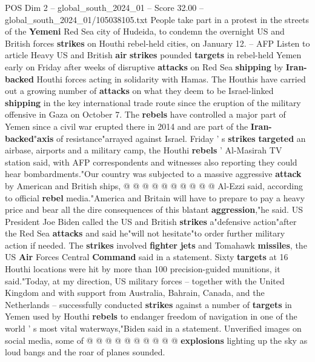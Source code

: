 \begin{textsample}{POS Dim 2 – global\_south\_2024\_01 – Score 32.00 – global\_south\_2024\_01/105038105.txt}  \label{ex:f2_pos_091}
People take part in a protest in the streets of the \textbf{Yemeni} Red Sea city of Hudeida, to condemn the overnight US and British forces \textbf{strikes} on Houthi rebel-held cities, on January 12. -- AFP Listen to article Heavy US and British \textbf{air} \textbf{strikes} pounded \textbf{targets} in rebel-held Yemen early on Friday after weeks of disruptive \textbf{attacks} on Red Sea \textbf{shipping} by \textbf{Iran-backed} Houthi forces acting in solidarity with Hamas.
The Houthis have carried out a growing number of \textbf{attacks} on what they deem to be Israel-linked \textbf{shipping} in the key international trade route since the eruption of the military offensive in Gaza on October 7.
The \textbf{rebels} have controlled a major part of Yemen since a civil war erupted there in 2014 and are part of the \textbf{Iran-backed}"\textbf{axis} of resistance"arrayed against Israel.
Friday ' s \textbf{strikes} \textbf{targeted} an airbase, airports and a military camp, the Houthi \textbf{rebels} ' Al-Masirah TV station said, with AFP correspondents and witnesses also reporting they could hear bombardments."Our country was subjected to a massive aggressive \textbf{attack} by American and British ships, @ @ @ @ @ @ @ @ @ @ Al-Ezzi said, according to official \textbf{rebel} media."America and Britain will have to prepare to pay a heavy price and bear all the dire consequences of this blatant \textbf{aggression},"he said.
US President Joe Biden called the US and British \textbf{strikes} a"defensive action"after the Red Sea \textbf{attacks} and said he"will not hesitate"to order further military action if needed.
The \textbf{strikes} involved \textbf{fighter} \textbf{jets} and Tomahawk \textbf{missiles}, the US \textbf{Air} Forces Central \textbf{Command} said in a statement.
Sixty \textbf{targets} at 16 Houthi locations were hit by more than 100 precision-guided munitions, it said."Today, at my direction, US military forces -- together with the United Kingdom and with support from Australia, Bahrain, Canada, and the Netherlands -- successfully conducted \textbf{strikes} against a number of \textbf{targets} in Yemen used by Houthi \textbf{rebels} to endanger freedom of navigation in one of the world ' s most vital waterways,"Biden said in a statement.
Unverified images on social media, some of @ @ @ @ @ @ @ @ @ @ \textbf{explosions} lighting up the sky as loud bangs and the roar of planes sounded.

\end{textsample}
